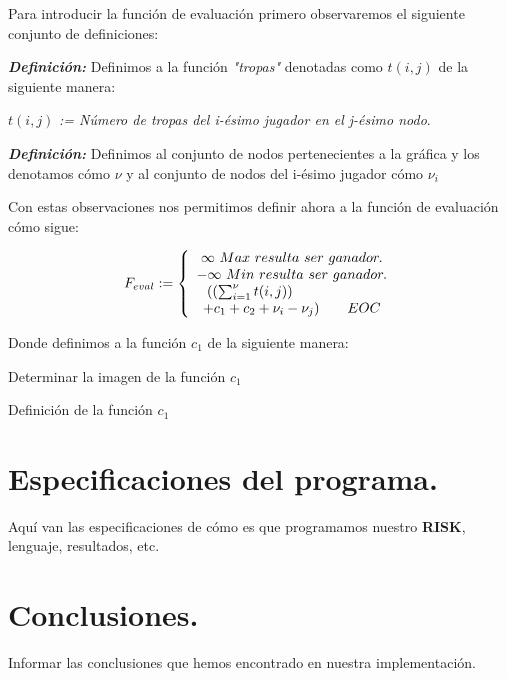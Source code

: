 \documentclass[12pt,twocolumn,draft]{article}
\begin{document}
Para introducir la funci\'on de evaluaci\'on primero observaremos el siguiente conjunto de definiciones:

\textbf{\textit{Definici\'on:}}
Definimos a la funci\'on  \textit{"tropas"} denotadas como 
$t(i,j)$ de la siguiente manera: 
\begin{center}
$t(i,j)$ \textit{:= N\'umero de tropas del i-\'esimo  jugador en el j-\'esimo nodo}.
\end{center}

\textbf{\textit{Definici\'on:}}
Definimos al conjunto de nodos pertenecientes a la gr\'afica y los denotamos c\'omo $\nu$ y al conjunto de nodos del i-\'esimo jugador c\'omo $\nu_{i}$

Con estas observaciones nos permitimos definir ahora a la funci\'on de evaluaci\'on c\'omo sigue:

$$ 
F_{eval}:= \left\{\begin{array}{c l}
  \infty\ Max\ resulta\ ser\ ganador.\\
  -\infty\ Min\ resulta\ ser\ ganador.\\
  ((\sum_{i=1}^{\nu} t(i,j)) \qquad \qquad \qquad\\
  +c_{1}+c_{2}+\nu_{i}-\nu_{j}) \qquad EOC
\end{array}
\right.
$$

Donde definimos a la funci\'on $c_{1}$ de la siguiente manera:

\begin{algorithm}
\begin{algorithmic}[1]
\ENSURE Determinar la imagen de la funci\'on $c_{1}$

\ENDFOR

\end{algorithmic}
\caption{Definici\'on de la funci\'on $c_{1}$}
\end{algorithm}


\section{Especificaciones del programa.}
Aqu\'i van las especificaciones de c\'omo es que programamos nuestro \textbf{RISK}, lenguaje, resultados, etc.

\section{Conclusiones.}
Informar las conclusiones que hemos encontrado en nuestra implementaci\'on. \cite{2personGT}


\newpage
	
{}
\end{document}
